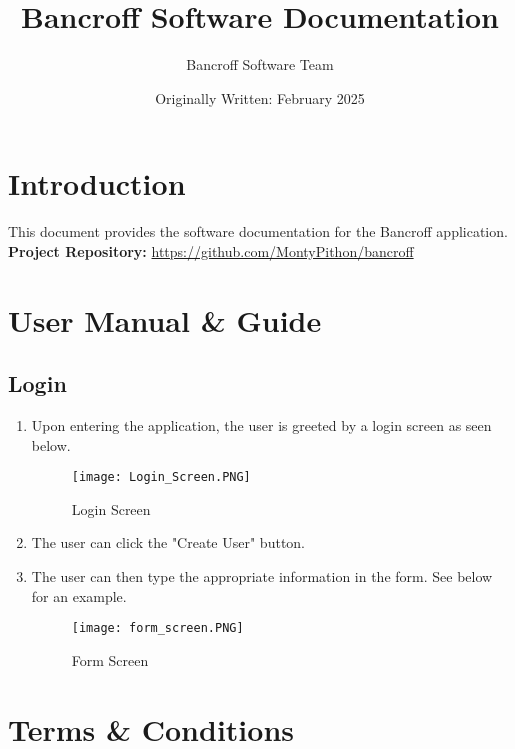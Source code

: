 \documentclass{article}
\title{Bancroff Software Documentation}
\author{Bancroff Software Team}
\date{Originally Written: February 2025}
\begin{document}
\maketitle

\section{Introduction}
This document provides the software documentation for the Bancroff application.\\[1ex]
\textbf{Project Repository:} \url{https://github.com/MontyPithon/bancroff}

\section{User Manual \& Guide}
    \subsection{Login}
        \begin{enumerate}
            \item Upon entering the application, the user is greeted by a login screen as seen below.
                \begin{figure}[h]
                \centering
                \texttt{[image: Login\_Screen.PNG]}
                \caption{Login Screen}
                \end{figure}
            \item The user can click the "Create User" button.
            \item The user can then type the appropriate information in the form. See below for an example.
                \begin{figure}[h]
                \centering
                \texttt{[image: form\_screen.PNG]}
                \caption{Form Screen}
                \end{figure}
        \end{enumerate}
        
\section{Terms \& Conditions}
\end{document}
